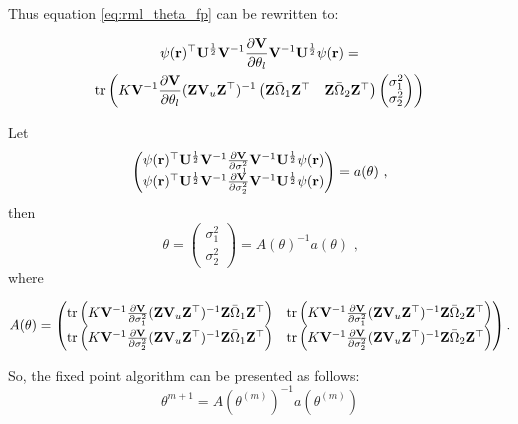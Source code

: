 Thus equation \ref{eq:rml_theta_fp} can be rewritten to:

\begin{multline*}
\psi(\mathbf{r})^\top\mathbf{U}^{\frac{1}{2}}\mathbf{V}^{-1}\frac{\partial\mathbf{V}}{\partial\theta_l}\mathbf{V}^{-1}\mathbf{U}^{\frac{1}{2}} \psi(\mathbf{r}) = \\ \operatorname{tr}\left(K\mathbf{V}^{-1}\frac{\partial\mathbf{V}}{\partial\theta_l} (\mathbf{Z}\mathbf{V}_u\mathbf{Z}^\top)^{-1} \left(\begin{matrix}\mathbf{Z}\bar{\Omega}_1\mathbf{Z}^\top & \mathbf{Z}\bar{\Omega}_2\mathbf{Z}^\top\end{matrix}\right)\left(\begin{matrix}
\sigma_1^2 \\
\sigma_2^2
\end{matrix}\right)\right)
\end{multline*}

Let \[
\left(\begin{matrix}
\psi(\mathbf{r})^\top\mathbf{U}^{\frac{1}{2}}\mathbf{V}^{-1}\frac{\partial\mathbf{V}}{\partial\sigma_1^2}\mathbf{V}^{-1}\mathbf{U}^{\frac{1}{2}} \psi(\mathbf{r}) \\
\psi(\mathbf{r})^\top\mathbf{U}^{\frac{1}{2}}\mathbf{V}^{-1}\frac{\partial\mathbf{V}}{\partial\sigma_2^2}\mathbf{V}^{-1}\mathbf{U}^{\frac{1}{2}} \psi(\mathbf{r})
\end{matrix}\right)
= a(\theta) \text{ ,}
\] then \[
\theta = \left(\begin{matrix}
\sigma_1^2 \\
\sigma_2^2
\end{matrix}\right) = A(\theta)^{-1} a(\theta) \text{ ,}
\] where

\begin{align*}
A(\theta) = \left(\begin{matrix}
\operatorname{tr}\left(K\mathbf{V}^{-1}\frac{\partial\mathbf{V}}{\partial\sigma_1^2} (\mathbf{Z}\mathbf{V}_u\mathbf{Z}^\top)^{-1} \mathbf{Z}\bar{\Omega}_1\mathbf{Z}^\top \right) &
\operatorname{tr}\left(K\mathbf{V}^{-1}\frac{\partial\mathbf{V}}{\partial\sigma_1^2} (\mathbf{Z}\mathbf{V}_u\mathbf{Z}^\top)^{-1} \mathbf{Z}\bar{\Omega}_2\mathbf{Z}^\top \right) \\
\operatorname{tr}\left(K\mathbf{V}^{-1}\frac{\partial\mathbf{V}}{\partial\sigma_2^2} (\mathbf{Z}\mathbf{V}_u\mathbf{Z}^\top)^{-1} \mathbf{Z}\bar{\Omega}_1\mathbf{Z}^\top \right) &
\operatorname{tr}\left(K\mathbf{V}^{-1}\frac{\partial\mathbf{V}}{\partial\sigma_2^2} (\mathbf{Z}\mathbf{V}_u\mathbf{Z}^\top)^{-1} \mathbf{Z}\bar{\Omega}_2\mathbf{Z}^\top \right)
\end{matrix}\right) \text{.}
\end{align*}

So, the fixed point algorithm can be presented as follows: \[
\theta^{m+1} = A(\theta^{(m)})^{-1} a(\theta^{(m)})
\]

